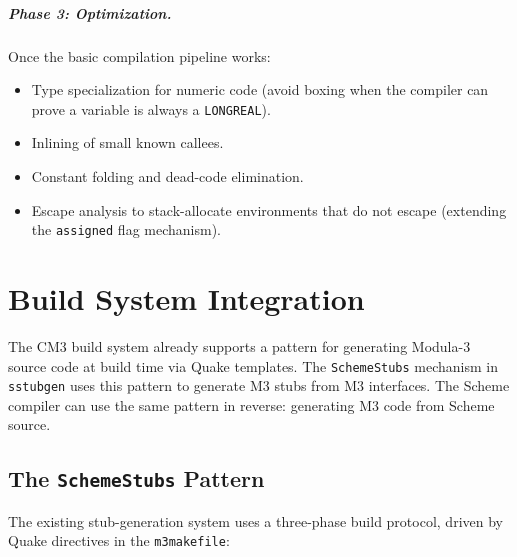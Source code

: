 \documentclass[12pt]{report}
\begin{document}
\paragraph{Phase 3: Optimization.}
Once the basic compilation pipeline works:

\begin{itemize}
\item Type specialization for numeric code (avoid boxing when the
  compiler can prove a variable is always a \texttt{LONGREAL}).
\item Inlining of small known callees.
\item Constant folding and dead-code elimination.
\item Escape analysis to stack-allocate environments that do not
  escape (extending the \texttt{assigned} flag mechanism).
\end{itemize}

\chapter{Build System Integration}
\label{ch:build}

The CM3 build system already supports a pattern for generating
Modula-3 source code at build time via Quake templates.  The
\texttt{SchemeStubs} mechanism in \texttt{sstubgen} uses this pattern
to generate M3 stubs from M3 interfaces.  The Scheme compiler can
use the same pattern in reverse: generating M3 code from Scheme
source.

\section{The \texttt{SchemeStubs} Pattern}

The existing stub-generation system uses a three-phase build
protocol, driven by Quake directives in the \texttt{m3makefile}:
\end{document}
